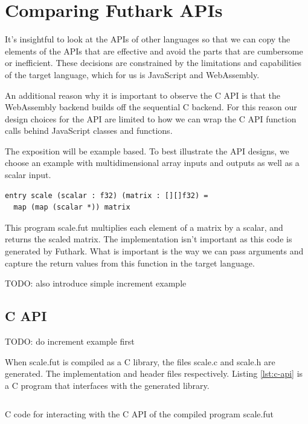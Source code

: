 \documentclass[11pt]{book}
\begin{document}
\section{Comparing Futhark APIs}

It's insightful to look at the APIs of other languages so that we can copy the elements of the APIs that are effective and avoid the parts that are cumbersome or inefficient. These decisions are constrained by the limitations and capabilities of the target language, which for us is JavaScript and WebAssembly.

An additional reason why it is important to observe the C API is that the WebAssembly backend builds off the sequential C backend. For this reason our design choices for the API are limited to how we can wrap the C API function calls behind JavaScript classes and functions.

The exposition will be example based. To best illustrate the API designs, we choose an example with multidimensional array inputs and outputs as well as a scalar input. 
\begin{verbatim}
entry scale (scalar : f32) (matrix : [][]f32) = 
  map (map (scalar *)) matrix
\end{verbatim}
This program scale.fut multiplies each element of a matrix by a scalar, and returns the scaled matrix. The implementation isn't important as this code is generated by Futhark. What is important is the way we can pass arguments and capture the return values from this function in the target language. 

TODO: also introduce simple increment example

\subsection{C API}

TODO: do increment example first

When scale.fut is compiled as a C library, the files scale.c and scale.h are generated. The implementation and header files respectively. Listing \ref{lst:c-api} is a C program that interfaces with the generated library. 


\begin{listing}[H] 
        \inputminted[fontsize=\small,baselinestretch=0.5,linenos]{C}{code/compiler/api_examples/example.c}
        \caption{C code for interacting with the C API of the compiled program scale.fut }
                        \label{lst:c-api}    
\end{listing} 
\end{document}
